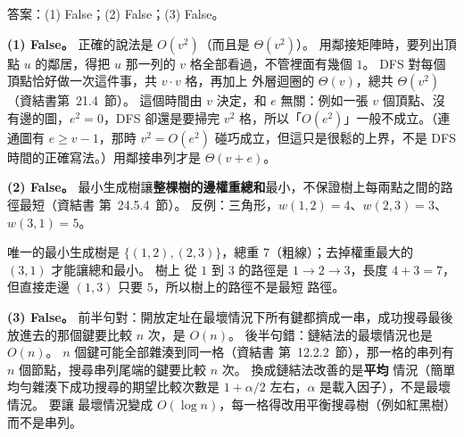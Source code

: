 \begin{pastsoln}
答案：(1) False；(2) False；(3) False。

\textbf{(1) False。} 正確的說法是 $O(v^2)$（而且是 $\Theta(v^2)$）。 用鄰接矩陣時，要列出頂點 $u$ 的鄰居，得把
$u$ 那一列的 $v$ 格全部看過，不管裡面有幾個 $1$。 DFS 對每個頂點恰好做一次這件事，共 $v \cdot v$ 格，再加上
外層迴圈的 $\Theta(v)$，總共 $\Theta(v^2)$（資結書第~21.4~節）。 這個時間由 $v$ 決定，和 $e$ 無關：例如一張
$v$ 個頂點、沒有邊的圖，$e^2 = 0$，DFS 卻還是要掃完 $v^2$ 格，所以「$O(e^2)$」一般不成立。（連通圖有
$e \ge v - 1$，那時 $v^2 = O(e^2)$ 碰巧成立，但這只是很鬆的上界，不是 DFS 時間的正確寫法。）用鄰接串列才是
$\Theta(v + e)$。

\textbf{(2) False。} 最小生成樹讓\textbf{整棵樹的邊權重總和}最小，不保證樹上每兩點之間的路徑最短（資結書
第~24.5.4~節）。 反例：三角形，$w(1,2) = 4$、$w(2,3) = 3$、$w(3,1) = 5$。

\begin{center}
\end{center}
唯一的最小生成樹是 $\{(1,2), (2,3)\}$，總重 $7$（粗線）；去掉權重最大的 $(3,1)$ 才能讓總和最小。 樹上
從 $1$ 到 $3$ 的路徑是 $1 \to 2 \to 3$，長度 $4 + 3 = 7$，但直接走邊 $(1, 3)$ 只要 $5$，所以樹上的路徑不是最短
路徑。

\textbf{(3) False。} 前半句對：開放定址在最壞情況下所有鍵都擠成一串，成功搜尋最後放進去的那個鍵要比較
$n$ 次，是 $O(n)$。 後半句錯：鏈結法的最壞情況也是 $O(n)$。 $n$ 個鍵可能全部雜湊到同一格（資結書
第~12.2.2~節），那一格的串列有 $n$ 個節點，搜尋串列尾端的鍵要比較 $n$ 次。 換成鏈結法改善的是\textbf{平均}
情況（簡單均勻雜湊下成功搜尋的期望比較次數是 $1 + \alpha/2$ 左右，$\alpha$ 是載入因子），不是最壞情況。 要讓
最壞情況變成 $O(\log n)$，每一格得改用平衡搜尋樹（例如紅黑樹）而不是串列。
\end{pastsoln}
